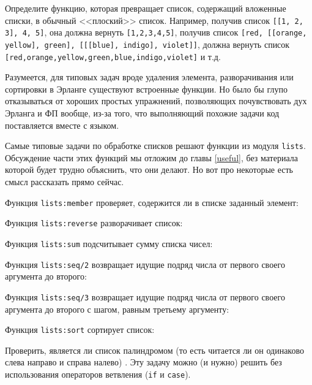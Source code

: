 \documentclass[
  paper=a4,
  fontsize=14pt,
  openany,
  appendixprefix=true
]{scrbook}
\begin{document}
\begin{problem}\label{flatten}
\complicated Определите функцию, которая превращает список, содержащий вложенные списки, в обычный <<плоский>> список. Например, получив список \lstinline{[[1, 2, 3], 4, 5]}, она должна вернуть \lstinline{[1,2,3,4,5]}, получив список \lstinline{[red, [[orange, yellow], green], [[[blue], indigo], violet]]}, должна вернуть список \lstinline{[red,orange,yellow,green,blue,indigo,violet]} и т.д.~\cite[07]{99problems}
\end{problem}

Разумеется, для типовых задач вроде удаления элемента, разворачивания или сортировки в Эрланге существуют встроенные функции. Но было бы глупо отказываться от хороших простых упражнений, позволяющих почувствовать дух Эрланга и ФП вообще, из-за того, что выполняющий похожие задачи код поставляется вместе с языком.

Самые типовые задачи по обработке списков решают функции из модуля \lstinline{lists}. Обсуждение части этих функций мы отложим до главы \ref{useful}, без материала которой будет трудно объяснить, что они делают. Но вот про некоторые есть смысл рассказать прямо сейчас.

Функция \lstinline{lists:member} проверяет, содержится ли в списке заданный элемент:

Функция \lstinline{lists:reverse} разворачивает список:

Функция \lstinline{lists:sum} подсчитывает сумму списка чисел:

Функция \lstinline{lists:seq/2} возвращает идущие подряд числа от первого своего аргумента до второго:

Функция \lstinline{lists:seq/3} возвращает идущие подряд числа от первого своего аргумента до второго с шагом, равным третьему аргументу:

Функция \lstinline{lists:sort} сортирует список:

\begin{problem}\label{palindrome}
Проверить, является ли список палиндромом (то есть читается ли он одинаково слева направо и справа налево) \cite[06]{99problems}. Эту задачу можно (и нужно) решить без использования операторов ветвления (\lstinline{if} и \lstinline{case}).
\end{problem}
\end{document}
